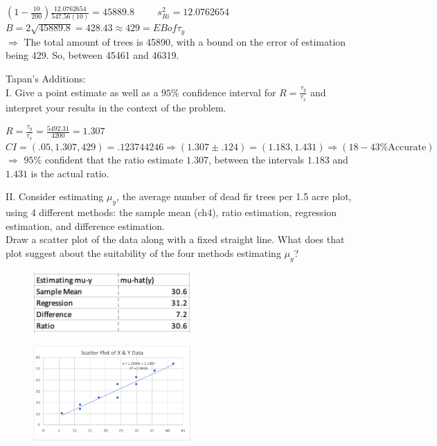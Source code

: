 \documentclass{article}
\begin{document}
\begin{center}
    $(1- \frac{10}{200}) \frac{12.0762654}{547.56(10)} = 45889.8 \hspace{1cm} s_{Ri}^2 = 12.0762654 $\\
    \smallskip
    $B = 2\sqrt{45889.8} = 428.43 \approx 429 = EB of \tau_y $\\
    \smallskip
    $\Rightarrow$ The total amount of trees is 45890, with a bound on the error of estimation being 429. So, between 45461 and 46319. 
\end{center}
Tapan's Additions: \\
\smallskip
I. Give a point estimate as well as a $95\%$ confidence interval for $R = \frac{\tau_y}{\tau_x}$ and interpret your results in the context of the problem. 
\begin{center}
    $R = \frac{\tau_y}{\tau_x} = \frac{5492.31}{4200} = 1.307 $\\
    \smallskip
    $CI = (.05, 1.307, 429) = .123744246 \Rightarrow (1.307 \pm .124) = (1.183, 1.431) \Rightarrow (18-43\% \text{Accurate}) $\\
    \smallskip
    $\Rightarrow$ $95\%$ confident that the ratio estimate $1.307$, between the intervals $1.183$ and $1.431$ is the actual ratio. 
\end{center}
II. Consider estimating $\mu_y$, the average number of dead fir trees per 1.5 acre plot, using 4 different methods: the sample mean (ch4), ratio estimation, regression estimation, and difference estimation. \\
Draw a scatter plot of the data along with a fixed straight line. What does that plot suggest about the suitability of the four methods estimating $\mu_y$? \\
\smallskip
\begin{figure}[h]
    \centering
    \includegraphics[width=6cm]{2iitable.png}
\end{figure}
\begin{figure}[h]
    \centering
    \includegraphics[width=6cm]{2iichart.png}
\end{figure}
\end{document}

